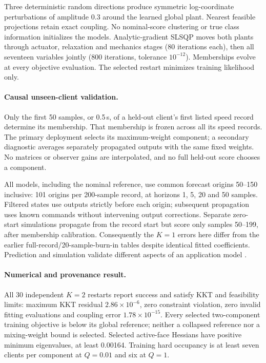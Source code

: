 Three deterministic random directions produce symmetric log-coordinate
perturbations of amplitude 0.3 around the learned global plant. Nearest
feasible projections retain exact coupling. No nominal-score clustering or
true class information initializes the models. Analytic-gradient SLSQP moves
both plants through actuator, relaxation and mechanics stages (80 iterations
each), then all seventeen variables jointly (800 iterations, tolerance
$10^{-12}$). Memberships evolve at every objective evaluation. The selected
restart minimizes training likelihood only.

\paragraph{Causal unseen-client validation.}
Only the first 50 samples, or 0.5\,s, of a held-out client's first listed speed
record determine its membership. That membership is frozen across all its
speed records. The primary deployment selects its maximum-weight component;
a secondary diagnostic averages separately propagated outputs with the same
fixed weights. No matrices or observer gains are interpolated, and no full
held-out score chooses a component.

All models, including the nominal reference, use common forecast origins
50--150 inclusive: 101 origins per 200-sample record, at horizons
1, 5, 20 and 50 samples. Filtered states use outputs strictly before each
origin; subsequent propagation uses known commands without intervening output
corrections. Separate zero-start simulations propagate from the record start
but score only samples 50--199, after membership calibration. Consequently
the $K=1$ errors here differ from the earlier full-record/20-sample-burn-in
tables despite identical fitted coefficients. Prediction and simulation
validate different aspects of an application model \cite{mathworksPrediction2026}.

\paragraph{Numerical and provenance result.}
All 30 independent $K=2$ restarts report success and satisfy KKT and feasibility
limits: maximum KKT residual $2.86\times10^{-6}$, zero constraint violation,
zero invalid fitting evaluations and coupling error $1.78\times10^{-15}$.
Every selected two-component training objective is below its global reference;
neither a collapsed reference nor a mixing-weight bound is selected.
Selected active-face Hessians have positive minimum eigenvalues, at least
0.00164. Training hard occupancy is at least seven clients per component at
$Q=0.01$ and six at $Q=1$.

